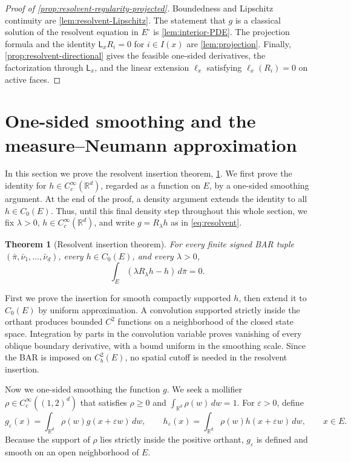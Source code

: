 \documentclass[aihp]{imsart}
\numberwithin{equation}{section}
\theoremstyle{plain}
\newtheorem{theorem}{Theorem}[section]
\theoremstyle{definition}
\newcommand{\R}{\mathbb R}
\newcommand{\1}{\mathbf 1}
\begin{document}
\begin{proof}[Proof of \cref{prop:resolvent-regularity-projected}]
Boundedness and Lipschitz continuity are \cref{lem:resolvent-Lipschitz}. The statement that $g$ is a classical solution of the resolvent equation in $E^\circ$ is \cref{lem:interior-PDE}. The projection formula and the identity $\mathsf L_xR_i=0$ for $i\in I(x)$ are \cref{lem:projection}. Finally, \cref{prop:resolvent-directional} gives the feasible one-sided derivatives, the factorization through $\mathsf L_x$, and the linear extension $\ell_x$ satisfying $\ell_x(R_i)=0$ on active faces.
\end{proof}

\section{One-sided smoothing and the measure--Neumann approximation}\label{sec:smoothing}

In this section we prove the resolvent insertion theorem,
\cref{thm:resolvent-insertion}.  We first prove the
identity for $h\in C_c^\infty(\mathbb R^d)$, regarded as a function on $E$, by
a one-sided smoothing argument.  At the end of the proof, a density argument
extends the identity to all $h\in C_0(E)$.  Thus, until this final density step throughout this whole section,
we fix $\lambda>0$, $h\in C_c^\infty(\mathbb R^d)$, and write
$g=R_\lambda h$ as in \eqref{eq:resolvent}.


\begin{theorem}[Resolvent insertion theorem]\label{thm:resolvent-insertion}
For every finite signed BAR tuple $(\bar\pi,\bar\nu_1,\ldots,\bar\nu_d)$, every $h\in C_0(E)$, and every $\lambda>0$,
\begin{equation}\label{eq:resolvent-invariance}
\tag{RI}
 \int_E(\lambda R_\lambda h-h)\,d\bar\pi=0.
\end{equation}
\end{theorem}

First we prove the insertion for smooth compactly supported $h$, then extend it to $C_0(E)$ by uniform approximation. A convolution supported strictly inside the orthant produces bounded $C^2$ functions on a neighborhood of the closed state space. Integration by parts in the convolution variable proves vanishing of every oblique boundary derivative, with a bound uniform in the smoothing scale. Since the BAR is imposed on $C_b^2(E)$, no spatial cutoff is needed in the resolvent insertion.

Now we one-sided smoothing the function $g$. We seek a mollifier $\rho\in C_c^\infty((1,2)^d)$ that satisfies $\rho\ge0$ and $\int_{\R^d}\rho(w)\,dw=1.$ For $\varepsilon>0$, define
\begin{equation}\label{eq:one-sided-smoothing}
 g_\varepsilon(x)=\int_{\R^d}\rho(w)g(x+\varepsilon w)\,dw,\qquad h_\varepsilon(x)=\int_{\mathbb R^d}\rho(w)h(x+\varepsilon w)\,dw ,
 \qquad x\in E.
\end{equation}
Because the support of $\rho$ lies strictly inside the positive orthant, $g_\varepsilon$ is defined and smooth on an open neighborhood of $E$.
\end{document}

